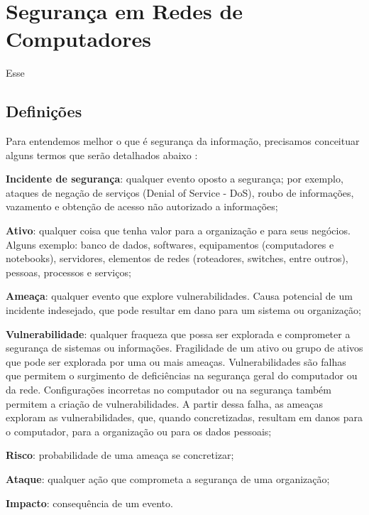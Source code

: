 \chapter{Segurança em Redes de Computadores} \label{ch:segurança}

Esse 

\section{Definições} \label{sec:definições}

Para entendemos melhor o que é segurança da informação, precisamos conceituar alguns termos que serão detalhados abaixo \cite{esr-gestao}:

\begin{alineas}
 \item \textbf{Incidente de segurança}: qualquer evento oposto a segurança; por exemplo, ataques de negação de serviços (Denial of Service - DoS), roubo de informações, vazamento e obtenção de acesso não autorizado a informações;
 \item \textbf{Ativo}: qualquer coisa que tenha valor para a organização e para seus negócios. Alguns exemplo: banco de dados, softwares, equipamentos (computadores e notebooks), servidores, elementos de redes (roteadores, switches, entre outros), pessoas, processos e serviços;
 \item \textbf{Ameaça}: qualquer evento que explore vulnerabilidades. Causa potencial de um incidente indesejado, que pode resultar em dano para um sistema ou organização;
 \item \textbf{Vulnerabilidade}: qualquer fraqueza que possa ser explorada e comprometer a segurança de sistemas ou informações. Fragilidade de um ativo ou grupo de ativos que pode ser explorada por uma ou mais ameaças. Vulnerabilidades são falhas que permitem o surgimento de deficiências na segurança geral do computador ou da rede. Configurações incorretas no computador ou na segurança também permitem a criação de vulnerabilidades. A partir dessa falha, as ameaças exploram as vulnerabilidades, que, quando concretizadas, resultam em danos para o computador, para a organização ou para os dados pessoais;
 \item \textbf{Risco}: probabilidade de uma ameaça se concretizar;
 \item \textbf{Ataque}: qualquer ação que comprometa a segurança de uma organização;
 \item \textbf{Impacto}: consequência de um evento.
\end{alineas}

